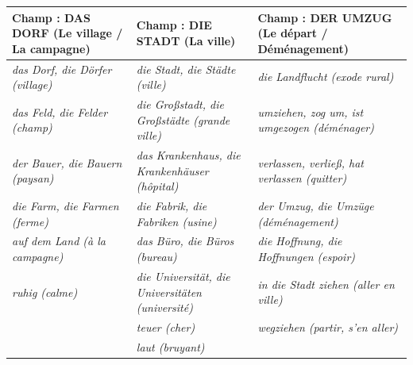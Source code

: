 \documentclass[11pt]{article}
\newcommand{\all}[1]{\ifmmode\text{\textit{#1}}\else\begingroup\selectlanguage{ngerman}\itshape #1\endgroup\fi}
\begin{document}
\begin{center}
\begin{tabularx}{\linewidth}{|X|X|X|}
\hline
\rowcolor{popblueL}
\textbf{Champ : DAS DORF (Le village / La campagne)} & \textbf{Champ : DIE STADT (La ville)} & \textbf{Champ : DER UMZUG (Le départ / Déménagement)} \\
\hline
\all{das Dorf, die Dörfer} (village) & \all{die Stadt, die Städte} (ville) & \all{die Landflucht} (exode rural) \\
\all{das Feld, die Felder} (champ) & \all{die Großstadt, die Großstädte} (grande ville) & \all{umziehen, zog um, ist umgezogen} (déménager) \\
\all{der Bauer, die Bauern} (paysan) & \all{das Krankenhaus, die Krankenhäuser} (hôpital) & \all{verlassen, verließ, hat verlassen} (quitter) \\
\all{die Farm, die Farmen} (ferme) & \all{die Fabrik, die Fabriken} (usine) & \all{der Umzug, die Umzüge} (déménagement) \\
\all{auf dem Land} (à la campagne) & \all{das Büro, die Büros} (bureau) & \all{die Hoffnung, die Hoffnungen} (espoir) \\
\all{ruhig} (calme) & \all{die Universität, die Universitäten} (université) & \all{in die Stadt ziehen} (aller en ville) \\
& \all{teuer} (cher) & \all{wegziehen} (partir, s'en aller) \\
& \all{laut} (bruyant) & \\
\hline
\end{tabularx}
\end{center}
\end{document}
